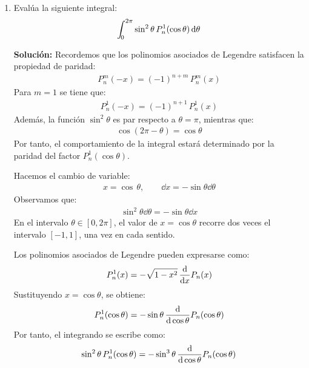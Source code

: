 \documentclass[hidelinks,12pt]{article}
\def\scaleint#1{\vcenter{\hbox{\scaleto[3ex]{\displaystyle\int}{#1}}}}
\def\bs{\mkern-12mu}
\begin{document}
\begin{enumerate}[resume]
\begin{align*}
\end{align*}
se obtiene finalmente una expresión únicamente en términos de $J_{0}$ y $J_{1}$. El resultado de la derivada es:
\begin{align*}
\boxed{
\dv{x} \left[ x^{3} J_{4} \left( x^{2} \right) \right] = x^{2} \, \Big[ \big( 3 \, x^{2} - 48 \, \big) J_{0} \left( x^{2} \right) + \big( 24 - 6 \, x^{2} \big) \, J_{1} \left( x^{2} \right) \Big]
}
\end{align*}
\item Evalúa la siguiente integral:
\begin{align*}
\scaleint{5ex}_{\bs 0}^{2 \pi} \sin^{2} \theta \, P_{n}^{1} (\cos \theta) \dd{\theta}
\end{align*}

\noindent
\textbf{Solución: } Recordemos que los polinomios asociados de Legendre satisfacen la propiedad de paridad:
\begin{align*}
P_{n}^{m} (-x) = (-1)^{n+m} \, P_{n}^{m} (x)
\end{align*}
Para $m = 1$ se tiene que:
\begin{align*}
P_{n}^{1} (-x) = (-1)^{n+1} \, P_{n}^{1} (x)
\end{align*}
Además, la función $\sin^{2} \theta$ es par respecto a $\theta = \pi$, mientras que:
\begin{align*}
\cos (2 \pi - \theta) = \cos \theta
\end{align*}
Por tanto, el comportamiento de la integral estará determinado por la paridad del factor $P_n^1 (\cos \theta)$.

Hacemos el cambio de variable:
\begin{align*}
x = \cos \, \theta, \qquad \dd{x} = - \sin \theta \dd{\theta}
\end{align*}
Observamos que:
\begin{align*}
\sin^{2} \theta \dd{\theta} = - \sin \theta \dd{x}
\end{align*}
En el intervalo $\theta \in [0, 2 \pi]$, el valor de $x = \cos \theta$ recorre dos veces el intervalo $[-1, 1]$, una vez en cada sentido.

Los polinomios asociados de Legendre pueden expresarse como:
\begin{align*}
P_{n}^{1} (x) = - \sqrt{1 - x^{2}} \, \dv{x} P_{n} (x)
\end{align*}
Sustituyendo $x = \cos \theta$, se obtiene:
\begin{align*}
P_{n}^{1} (\cos \theta) = - \sin \theta \, \dv{\cos \theta} P_{n} (\cos \theta)
\end{align*}
Por tanto, el integrando se escribe como:
\begin{align*}
\sin^{2} \theta \, P_{n}^{1} (\cos \theta) = - \sin^{3} \theta \, \dv{\cos \theta} P_{n} (\cos\theta)
\end{align*}


\end{enumerate}
\end{document}
